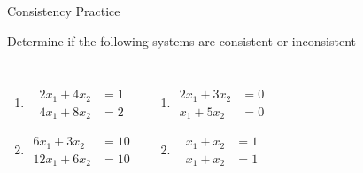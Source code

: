 \documentclass[xcoler=dvipsnames, aspectratio=169]{beamer}
\begin{document}
\begin{frame}{Consistency Practice}
    \begin{practice}
        Determine if the following systems are consistent or inconsistent
        \begin{columns}
            \begin{enumerate}
                \item \begin{align*}
                        2x_1 + 4x_2 &= 1\\
                        4x_1 + 8x_2 &= 2
                \end{align*}
                \item \begin{align*}
                        6x_1 + 3x_2 &= 10\\
                        12x_1 + 6x_2 &= 10
                \end{align*}
            \end{enumerate}
            \begin{enumerate}\addtocounter{enumi}{2}
                \item \begin{align*}
                        2x_1 + 3x_2 &=0 \\
                         x_1 + 5x_2 &= 0
                \end{align*}
                \item \begin{align*}
                        x_1 + x_2 &= 1\\
                        x_1 + x_2 &= 1
                \end{align*}
            \end{enumerate}
        \end{columns}
    \end{practice}
\end{frame}
\end{document}
